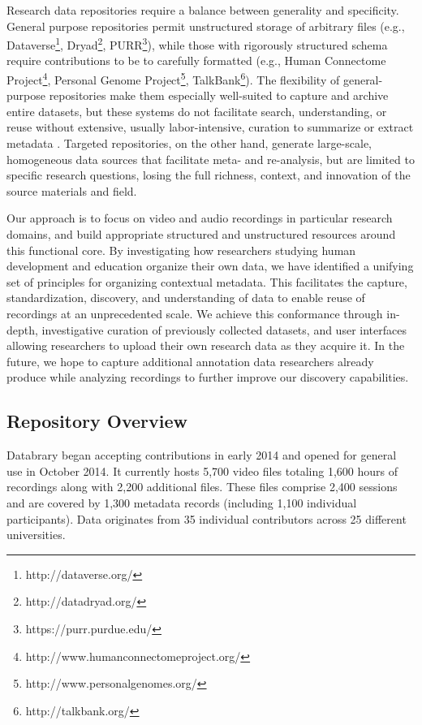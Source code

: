 \documentclass{sig-alternate}
\begin{document}
Research data repositories require a balance between generality and specificity.
General purpose repositories permit unstructured storage of arbitrary files (e.g., Dataverse\footnote{http://dataverse.org/}, Dryad\footnote{http://datadryad.org/}, PURR\footnote{https://purr.purdue.edu/}), while those with rigorously structured schema require contributions to be to carefully formatted (e.g., Human Connectome Project\footnote{http://www.humanconnectomeproject.org/}, Personal Genome Project\footnote{http://www.personalgenomes.org/}, TalkBank\footnote{http://talkbank.org/}).
The flexibility of general-purpose repositories make them especially well-suited to capture and archive entire datasets, but these systems do not facilitate search, understanding, or reuse without extensive, usually labor-intensive, curation to summarize or extract metadata \cite{Peer_2012}.
Targeted repositories, on the other hand, generate large-scale, homogeneous data sources that facilitate meta- and re-analysis, but are limited to specific research questions, losing the full richness, context, and innovation of the source materials and field.

Our approach is to focus on video and audio recordings in particular research domains, and build appropriate structured and unstructured resources around this functional core.
By investigating how researchers studying human development and education organize their own data, we have identified a unifying set of principles for organizing contextual metadata.
This facilitates the capture, standardization, discovery, and understanding of data to enable reuse of recordings at an unprecedented scale.
We achieve this conformance through in-depth, investigative curation of previously collected datasets, and user interfaces allowing researchers to upload their own research data as they acquire it.
In the future, we hope to capture additional annotation data researchers already produce while analyzing recordings to further improve our discovery capabilities.

\subsection*{Repository Overview}

Databrary began accepting contributions in early 2014 and opened for general use in October 2014.
It currently hosts 5,700 video files totaling 1,600 hours of recordings along with 2,200 additional files.
These files comprise 2,400 sessions and are covered by 1,300 metadata records (including 1,100 individual participants).
Data originates from 35 individual contributors across 25 different universities.
\end{document}
